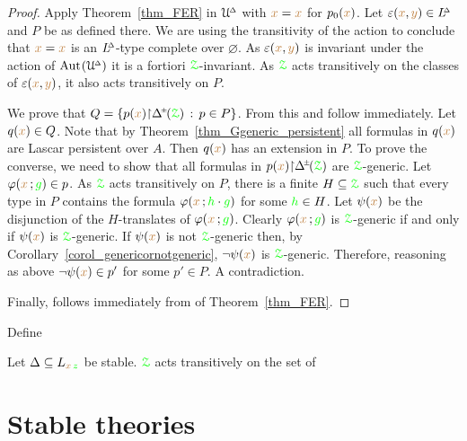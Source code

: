 \begin{proof}
  Apply Theorem~\ref{thm_FER} in $\EuScript U\kern-.2ex^{\scriptscriptstyle\Delta}$ with ${\color{brown} x}={\color{brown} x}$ for $p_0({\color{brown} x})$.
  Let $\varepsilon({\color{brown} x},{\color{brown} y})\in L\kern-.5ex^{\scriptscriptstyle\Delta}$ and $P$ be as defined there.
  We are using the transitivity of the action to conclude that ${\color{brown} x}={\color{brown} x}$ is an $L\kern-.5ex^{\scriptscriptstyle\Delta}$-type complete over $\varnothing$.
  As $\varepsilon({\color{brown} x},{\color{brown} y})$ is invariant under the action of ${\rm Aut\kern.15ex}(\EuScript U\kern-.2ex^{\scriptscriptstyle\Delta})$ it is a fortiori ${\color{green}\EuScript Z}$-invariant.
  As ${\color{green}\EuScript Z}$ acts transitively on the classes of $\varepsilon({\color{brown} x},{\color{brown} y})$, it also acts transitively on $P$.

  We prove that $Q=\{p({\mr x}){\restriction}\pmDelta(\grZ)\, :\, p\in P\}$.
  From this  and  follow immediately.
  Let $q({\color{brown} x})\in Q$. Note that by Theorem~\ref{thm_Ggeneric_persistent} all formulas in $q({\color{brown} x})$ are Lascar persistent over $A$.
  Then $q({\color{brown} x})$ has an extension in $P$.
  To prove the converse, we need to show that all formulas in $p({\mr x}){\restriction}\pmDelta(\grZ)$ are ${\color{green}\EuScript Z}$-generic.
  Let $\varphi({\color{brown} x}\,;{\color{green} g})\in p$.
  As ${\color{green}\EuScript Z}$ acts transitively on $P$, there is a finite $H\subseteq{\color{green}\EuScript Z}$ such that every type in $P$ contains the formula $\varphi({\color{brown} x}\,;{\color{green} h}\cdot{\color{green}g})$ for some ${\color{green} h}\in H$.
  Let $\psi({\color{brown} x})$ be the disjunction of the $H$-translates of $\varphi({\color{brown} x}\,;{\color{green} g})$.
  Clearly $\varphi({\color{brown} x}\,;{\color{green} g})$ is ${\color{green}\EuScript Z}$-generic if and only if $\psi({\color{brown} x})$ is ${\color{green}\EuScript Z}$-generic.
  If $\psi({\color{brown} x})$ is not  ${\color{green}\EuScript Z}$-generic then, by Corollary~\ref{corol_genericornotgeneric}, $\neg\psi({\color{brown} x})$ is ${\color{green}\EuScript Z}$-generic.
  Therefore, reasoning as above $\neg\psi({\color{brown} x})\in p'$ for some $p'\in P$.
  A contradiction.

  Finally,  follows immediately from  of Theorem~\ref{thm_FER}.
\end{proof}

Define 



\begin{proposition}
  Let $\Delta\subseteq L_{{\color{brown} x}\,{\color{green} z}}$ be stable.
  ${\color{green}\EuScript Z}$ acts transitively on the set of 
\end{proposition}

\section{Stable theories}
\label{stable_theories}

